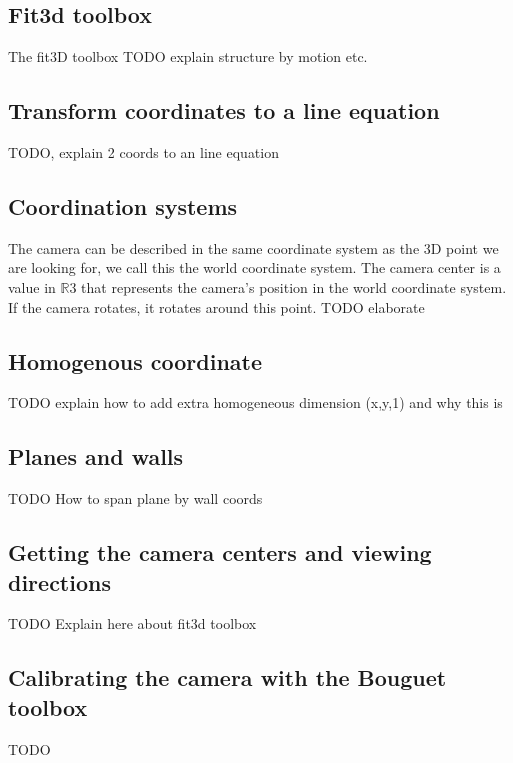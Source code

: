 \subsection{Fit3d toolbox}
The fit3D toolbox \cite{Fit3d} 
TODO explain structure by motion etc.

\subsection{Transform coordinates to a line equation}
\label{sec:lineeq}
TODO, explain 2 coords to an line equation


\subsection{Coordination systems}
The camera can be described in the same coordinate system as the 3D point we are
looking for, we call this the world coordinate system. 
The camera center is a value in $\mathbb{R}$3 that represents the camera's position in the world
coordinate system. If the camera rotates, it rotates around this point.
TODO elaborate\\

\subsection{Homogenous coordinate}
TODO explain how to add extra homogeneous dimension (x,y,1) and why this is


\subsection{Planes and walls}
\label{sec:planeswalls}
TODO How to span plane by wall coords

\subsection{Getting the camera centers and viewing directions}
\label{sec:cameracenters}
TODO Explain here about fit3d toolbox

\subsection{Calibrating the camera with the Bouguet toolbox}
\label{sec:bouguet}
TODO


